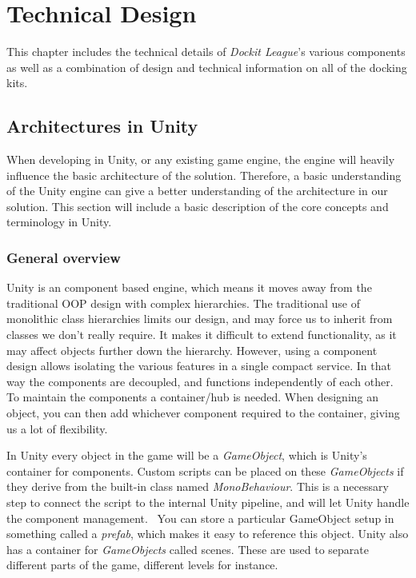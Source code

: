 \chapter{Technical Design}
\label{chap:technical}

This chapter includes the technical details of \emph{Dockit League}'s various components as well as a combination of design and technical information on all of the docking kits.  

\section{Architectures in Unity}
When developing in Unity, or any existing game engine, the engine will heavily influence the basic architecture of the solution. Therefore, a basic understanding of the Unity engine can give a better understanding of the architecture in our solution. This section will include a basic description of the core concepts and terminology in Unity.

\subsection{General overview}
Unity is an component based engine, which means it moves away from the traditional OOP design with complex hierarchies. The traditional use of monolithic class hierarchies limits our design, and may force us to inherit from classes we don't really require. It makes it difficult to extend functionality, as it may affect objects further down the hierarchy. However, using a component design allows isolating the various features in a single compact service. In that way the components are decoupled, and functions independently of each other. To maintain the components a container/hub is needed. When designing an object, you can then add whichever component required to the container, giving us a lot of flexibility.~\cite{gameEngineArch}

In Unity every object in the game will be a \emph{GameObject}, which is Unity's container for components. Custom scripts can be placed on these \emph{GameObjects} if they derive from the built-in class named \emph{MonoBehaviour}. This is a necessary step to connect the script to the internal Unity pipeline, and will let Unity handle the component management.~\cite{unityScriptManual} You can store a particular GameObject setup in something called a \emph{prefab}, which makes it easy to reference this object. Unity also has a container for \emph{GameObjects} called scenes. These are used to separate different parts of the game, different levels for instance.

